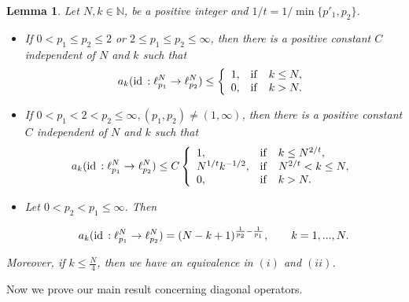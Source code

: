 \documentclass[12pt]{article}
\newtheorem{Lem}{Lemma}
\def\id{\mathop{\rm id \,}\nolimits}
\newcommand{\N}{{\mathbb N}}
\begin{document}
\begin{Lem}\label{Na} 
	Let $N,k\in\N$, be a positive integer and $1/t=1/\min\{p'_1,p_2\}$.
	\begin{itemize}
		\item[$(i)$] If	$	0< p_1\leq p_2\leq 2$ or 	$	2\leq p_1\leq p_2\leq\infty$, then there is a positive constant $C$ independent of $N$ and $k$ such that
		\begin{equation*}
			a_k(\id:\ell_{p_1}^N\rightarrow \ell_{p_2}^N)\leq \left\{ \begin{array}{ll} 1, & {\mathrm{if}\quad k\leq N,}
				\\
				
				0,&{\mathrm{if}\quad k>N.} \end{array}\right. 
		\end{equation*}
		
		\item[$(ii)$] If	$	0< p_1<2< p_2\leq \infty, (p_1,p_2)\neq(1,\infty)$, then there is a positive constant $C$ independent of $N$ and $k$ such that
				\begin{equation*}
			a_k(\id:\ell_{p_1}^N\rightarrow \ell_{p_2}^N)\leq C \left\{ \begin{array}{ll} 1, & {\mathrm{if}\quad k\leq N^{2/t},}
				\\
				N^{1/t}k^{-1/2} ,& {\mathrm{if}\quad N^{2/t}< k\leq N,}
				\\ 
				0,&{\mathrm{if}\quad k>N.} \end{array}\right. 
		\end{equation*}
		
		\item[$(iii)$] Let 	$	0< p_2< p_1\leq \infty$. Then
		
		\begin{equation*}
			a_k(\id:\ell_{p_1}^N\rightarrow \ell_{p_2}^N)=(N-k+1)^{\frac{1}{p_2}-\frac{1}{p_1}},\qquad k=1,...,N.
		\end{equation*}	
		
	\end{itemize}
	Moreover, if $k\leq \frac N 4$, then we have an equivalence in $(i)$ and $(ii)$.
\end{Lem}

Now we prove our main result concerning diagonal operators. 
\end{document}
